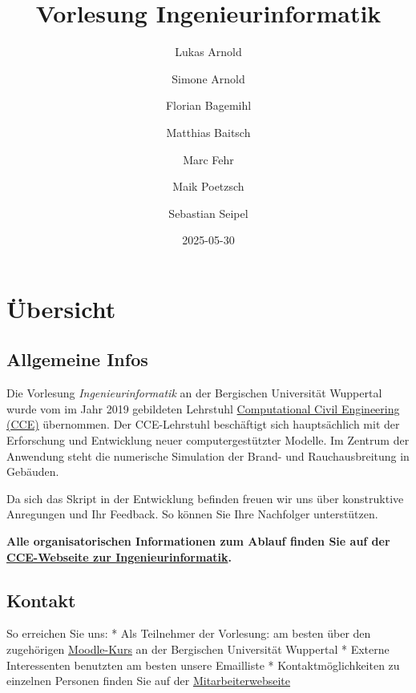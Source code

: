 \documentclass[
  letterpaper,
  DIV=11,
  numbers=noendperiod]{scrreprt}
\title{Vorlesung Ingenieurinformatik}
\author{Lukas Arnold \and Simone Arnold \and Florian
Bagemihl \and Matthias Baitsch \and Marc Fehr \and Maik
Poetzsch \and Sebastian Seipel}
\date{2025-05-30}
\renewcommand*\contentsname{Table of contents}
\newcommand\contentsname{Table of contents}
\begin{document}
\maketitle

\renewcommand*\contentsname{Table of contents}
{
\hypersetup{linkcolor=}
\setcounter{tocdepth}{2}
\tableofcontents
}


\chapter*{Übersicht}\label{uxfcbersicht}


\section*{Allgemeine Infos}\label{allgemeine-infos}


Die Vorlesung \emph{Ingenieurinformatik} an der Bergischen Universität
Wuppertal wurde vom im Jahr 2019 gebildeten Lehrstuhl
\href{https://cce.uni-wuppertal.de/}{Computational Civil Engineering
(CCE)} übernommen. Der CCE-Lehrstuhl beschäftigt sich hauptsächlich mit
der Erforschung und Entwicklung neuer computergestützter Modelle. Im
Zentrum der Anwendung steht die numerische Simulation der Brand- und
Rauchausbreitung in Gebäuden.

Da sich das Skript in der Entwicklung befinden freuen wir uns über
konstruktive Anregungen und Ihr Feedback. So können Sie Ihre Nachfolger
unterstützen.

\textbf{Alle organisatorischen Informationen zum Ablauf finden Sie auf
der
\href{https://cce.uni-wuppertal.de/index.php?id=4178&L=0}{CCE-Webseite
zur Ingenieurinformatik}.}

\section*{Kontakt}\label{kontakt}


So erreichen Sie uns: * Als Teilnehmer der Vorlesung: am besten über den
zugehörigen
\href{https://moodle.uni-wuppertal.de/course/view.php?id=46894}{Moodle-Kurs}
an der Bergischen Universität Wuppertal * Externe Interessenten
benutzten am besten unsere Emailliste * Kontaktmöglichkeiten zu
einzelnen Personen finden Sie auf der
\href{https://cce.uni-wuppertal.de/de/team/}{Mitarbeiterwebseite}
\end{document}
